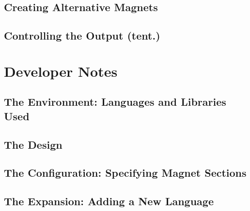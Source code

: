 \documentclass[letter,10pt]{article}
\begin{document}
\subsection{Creating Alternative Magnets}

\subsection{Controlling the Output (tent.)}



\section{Developer Notes}

\subsection{The Environment: Languages and Libraries Used}

\subsection{The Design}

\subsection{The Configuration: Specifying Magnet Sections}

\subsection{The Expansion: Adding a New Language}
\end{document}
